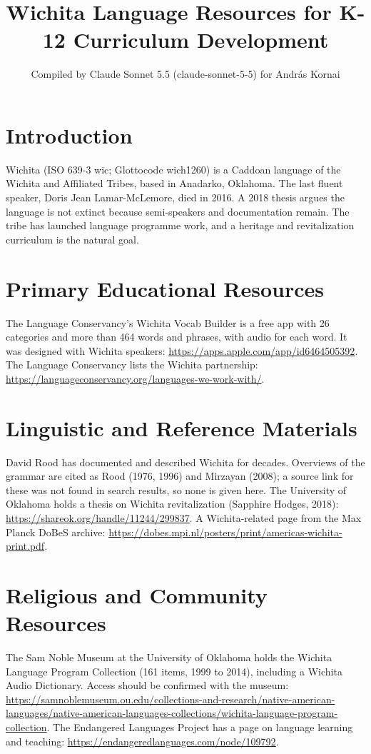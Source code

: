 \documentclass[12pt]{article}
\title{Wichita Language Resources for K-12 Curriculum Development}
\author{Compiled by Claude Sonnet 5.5 (claude-sonnet-5-5) for Andr\'as Kornai}
\date{}
\begin{document}
\maketitle

\section{Introduction}
Wichita (ISO 639-3 wic; Glottocode wich1260) is a Caddoan language of the Wichita and Affiliated Tribes, based in Anadarko, Oklahoma. The last fluent speaker, Doris Jean Lamar-McLemore, died in 2016. A 2018 thesis argues the language is not extinct because semi-speakers and documentation remain. The tribe has launched language programme work, and a heritage and revitalization curriculum is the natural goal.

\section{Primary Educational Resources}
The Language Conservancy's Wichita Vocab Builder is a free app with 26 categories and more than 464 words and phrases, with audio for each word. It was designed with Wichita speakers: \url{https://apps.apple.com/app/id6464505392}.
The Language Conservancy lists the Wichita partnership: \url{https://languageconservancy.org/languages-we-work-with/}.

\section{Linguistic and Reference Materials}
David Rood has documented and described Wichita for decades. Overviews of the grammar are cited as Rood (1976, 1996) and Mirzayan (2008); a source link for these was not found in search results, so none is given here.
The University of Oklahoma holds a thesis on Wichita revitalization (Sapphire Hodges, 2018): \url{https://shareok.org/handle/11244/299837}.
A Wichita-related page from the Max Planck DoBeS archive: \url{https://dobes.mpi.nl/posters/print/americas-wichita-print.pdf}.

\section{Religious and Community Resources}
The Sam Noble Museum at the University of Oklahoma holds the Wichita Language Program Collection (161 items, 1999 to 2014), including a Wichita Audio Dictionary. Access should be confirmed with the museum: \url{https://samnoblemuseum.ou.edu/collections-and-research/native-american-languages/native-american-languages-collections/wichita-language-program-collection}.
The Endangered Languages Project has a page on language learning and teaching: \url{https://endangeredlanguages.com/node/109792}.
\end{document}
